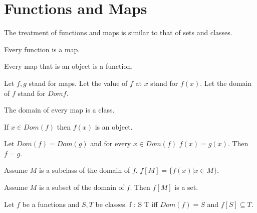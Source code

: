 \documentclass[11pt]{article}
\begin{document}
\section{Functions and Maps}
The treatment of functions and maps is similar to that
of sets and classes.
\begin{forthel}

\begin{lemma} Every function is a map.
\end{lemma}

\begin{lemma} Every map that is an object is a function.
\end{lemma}

Let $f,g$ stand for maps.
Let the value of $f$ at $x$ stand for $f(x)$.
Let the domain of $f$ stand for $Dom f$.

\begin{lemma} The domain of every map is a class.
\end{lemma}

\begin{lemma} If $x \in Dom(f)$ then $f(x)$ is an object.
\end{lemma}

\begin{lemma}  Let $Dom(f)=Dom(g)$ and for every $x \in Dom(f)$
$f(x)=g(x)$. Then $f=g$.
\end{lemma}


\begin{definition}
Assume $M$ is a subclass of the domain of $f$. 
$f[M] = \{ f(x) | x \in M \}$.
\end{definition}

\begin{axiom} 
Assume $M$ is a subset of the domain of $f$. 
Then $f[M]$ is a set.
\end{axiom}

\begin{definition} Let $f$ be a functions and $S,T$ be classes.
f : S \rightarrow T iff $Dom (f) = S$ and $f[S] \subseteq T$.
\end{definition}

\end{forthel}
\end{document}
